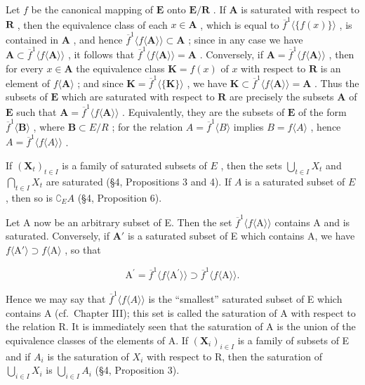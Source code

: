 Let \(f\) be the canonical mapping of \(\mathbf{E}\) onto \(\mathbf{E} / \mathbf{R}\) . If \(\mathbf{A}\) is saturated with respect to \(\mathbf{R}\) , then the equivalence class of each \(x \in \mathbf{A}\) , which is equal to \(\overline{f}^1 \langle \{f(x)\} \rangle\) , is contained in \(\mathbf{A}\) , and hence \(\overline{f}^1 \langle f\langle \mathbf{A}\rangle \rangle \subset \mathbf{A}\) ; since in any case we have \(\mathbf{A} \subset \overline{f}^1 \langle f\langle \mathbf{A}\rangle \rangle\) , it follows that \(\overline{f}^1 \langle f\langle \mathbf{A}\rangle \rangle = \mathbf{A}\) . Conversely, if \(\mathbf{A} = \overline{f}^1 \langle f\langle \mathbf{A}\rangle \rangle\) , then for every \(x \in \mathbf{A}\) the equivalence class \(\mathbf{K} = f(x)\) of \(x\) with respect to \(\mathbf{R}\) is an element of \(f\langle \mathbf{A}\rangle\) ; and since \(\mathbf{K} = \overline{f}^1 \langle \{\mathbf{K}\}\rangle\) , we have \(\mathbf{K} \subset \overline{f}^1 \langle f\langle \mathbf{A}\rangle \rangle = \mathbf{A}\) . Thus the subsets of \(\mathbf{E}\) which are saturated with respect to \(\mathbf{R}\) are precisely the subsets \(\mathbf{A}\) of \(\mathbf{E}\) such that \(\mathbf{A} = \overline{f}^1 \langle f\langle \mathbf{A}\rangle\rangle\) . Equivalently, they are the subsets of \(\mathbf{E}\) of the form \(\overline{f}^1\langle\mathbf{B}\rangle\) , where \(\mathbf{B} \subset E / R\) ; for the relation \(A = \overline{f}^1\langle B\rangle\) implies \(B = f\langle A\rangle\) , hence \(A = \overline{f}^1\langle f\langle A\rangle\rangle\) .

If \((\mathbf{X}_t)_{t\in I}\) is a family of saturated subsets of \(E\) , then the sets \(\bigcup_{t\in I} X_t\) and \(\bigcap_{t\in I} X_t\) are saturated (§4, Propositions 3 and 4). If \(A\) is a saturated subset of \(E\) , then so is \(\complement_E A\) (§4, Proposition 6).

Let A now be an arbitrary subset of E. Then the set \(\overline{f}^1\langle f\langle \mathrm{A}\rangle \rangle\) contains A and is saturated. Conversely, if \(\mathbf{A}'\) is a saturated subset of E which contains A, we have \(f\langle \mathrm{A}'\rangle \supset f\langle \mathrm{A}\rangle\) , so that

\[
\mathrm{A} ^ {\prime} = \overline {{f}} ^ {1} \langle f \langle \mathrm{A} ^ {\prime} \rangle \rangle \supset \overline {{f}} ^ {1} \langle f \langle \mathrm{A} \rangle \rangle .
\]

Hence we may say that \(\overline{f}^1\langle f\langle A\rangle \rangle\) is the ``smallest'' saturated subset of E which contains A (cf.~Chapter III); this set is called the saturation of A with respect to the relation R. It is immediately seen that the saturation of A is the union of the equivalence classes of the elements of A. If \((\mathbf{X}_{i})_{i\in I}\) is a family of subsets of E and if \(A_{i}\) is the saturation of \(X_{i}\) with respect to R, then the saturation of \(\bigcup_{i\in I}X_{i}\) is \(\bigcup_{i\in I}A_{i}\) (§4, Proposition 3).


